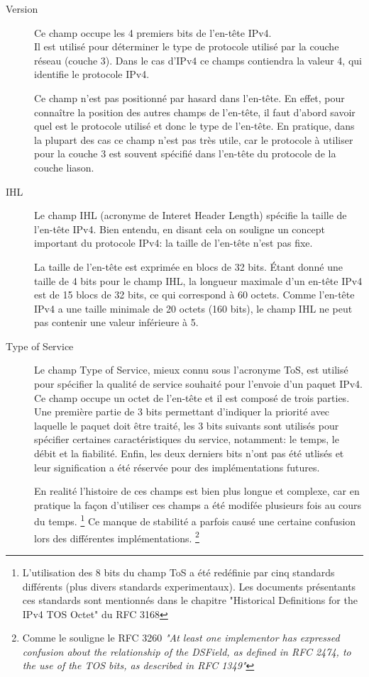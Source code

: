 \begin{description}
\item [Version] 
Ce champ occupe les 4 premiers bits de l'en-tête IPv4.\\
Il est utilisé pour déterminer le type de protocole utilisé par la couche
réseau (couche 3). Dans le cas d'IPv4 ce champs contiendra la valeur
4, qui identifie le protocole IPv4.

Ce champ n'est pas positionné par hasard dans l'en-tête. En effet, pour
connaître la position des autres champs de l'en-tête, il faut d'abord savoir
quel est le protocole utilisé et donc le type de l'en-tête.
En pratique, dans la plupart des cas ce champ n'est pas très utile, car le
protocole à utiliser pour la couche 3 est souvent spécifié dans l'en-tête du
protocole de la couche liason.

\item [IHL]
Le champ IHL (acronyme de Interet Header Length) spécifie la taille de l'en-tête IPv4. 
Bien entendu, en disant cela on souligne un concept important du protocole IPv4: 
la taille de l'en-tête n'est pas fixe.

La taille de l'en-tête est exprimée en blocs de 32 bits. Étant donné une taille de
4 bits pour le champ IHL, la longueur maximale d'un en-tête IPv4 est de 15 blocs de
32 bits, ce qui correspond à 60 octets. Comme l'en-tête IPv4 a une taille minimale
de 20 octets (160 bits), le champ IHL ne peut pas contenir une valeur inférieure à 5.

\item [Type of Service]
Le champ Type of Service, mieux connu sous l'acronyme ToS, est utilisé pour 
spécifier la qualité de service souhaité pour l'envoie d'un paquet IPv4.
Ce champ occupe un octet de l'en-tête et il est composé de trois parties.
Une première partie de 3 bits permettant d'indiquer la priorité avec laquelle
le paquet doit être traité, les 3 bits suivants sont utilisés pour spécifier 
certaines caractéristiques du service, notamment: le temps, le débit et la fiabilité.
Enfin, les deux derniers bits n'ont pas été utlisés et leur signification a été 
réservée pour des implémentations futures.

En realité l'histoire de ces champs est bien plus longue et complexe,
car en pratique la façon d'utiliser ces champs a été modifée plusieurs fois au 
cours du temps.
\footnote{L'utilisation des 8 bits du champ ToS a été redéfinie
par cinq standards différents (plus divers standards experimentaux).
Les documents présentants ces standards sont mentionnés dans le chapitre 
"Historical Definitions for the IPv4 TOS Octet" du RFC 3168}
Ce manque de stabilité a parfois causé une certaine confusion lors des différentes implémentations.
\footnote{Comme le souligne le RFC 3260 {\it "At least one implementor has expressed confusion about the
relationship of the DSField, as defined in RFC 2474, to the use of
the TOS bits, as described in RFC 1349"}}


\end{description}
